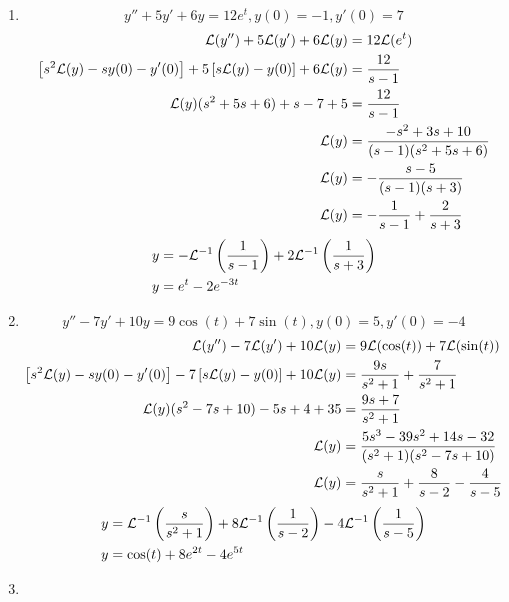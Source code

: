 \documentclass{article}
\begin{document}
\begin{enumerate}[label = \textbf{\arabic*)}]
	\item
		\begin{equation*}
			y'' + 5y' + 6y = 12e^t, y(0) = -1, y'(0) = 7
		\end{equation*}
		\begin{align*}
			\mathcal{L}(y'') + 5\mathcal{L}(y') + 6\mathcal{L}(y) & = 12\mathcal{L}(e^t) \\
			\left[ s^2\mathcal{L}(y) - sy(0) - y'(0) \right] + 5 \left[ s\mathcal{L}(y) - y(0) \right] + 6\mathcal{L}(y) & = \frac{12}{s - 1} \\
			\mathcal{L}(y)(s^2 + 5s + 6) + s - 7 + 5 & = \frac{12}{s - 1} \\
			\mathcal{L}(y) & = \frac{-s^2 + 3s + 10}{(s - 1)(s^2 + 5s + 6)} \\
			\mathcal{L}(y) & = -\frac{s - 5}{(s - 1)(s + 3)} \\
			\mathcal{L}(y) & = -\frac{1}{s - 1} + \frac{2}{s + 3}
		\end{align*}
		\begin{align*}
			y & = -\mathcal{L}^{-1} \left( \frac{1}{s - 1} \right) + 2\mathcal{L}^{-1} \left( \frac{1}{s + 3} \right) \\
			y & = e^t - 2e^{-3t}
		\end{align*}
	\item
		\begin{equation*}
			y'' - 7y' + 10y = 9\cos(t) + 7\sin(t), y(0) = 5, y'(0) = -4
		\end{equation*}
		\begin{align*}
			\mathcal{L}(y'') - 7\mathcal{L}(y') + 10\mathcal{L}(y) & = 9\mathcal{L}(\cos(t)) + 7\mathcal{L}(\sin(t)) \\
			\left[ s^2\mathcal{L}(y) - sy(0) - y'(0) \right] - 7 \left[ s\mathcal{L}(y) - y(0) \right] + 10\mathcal{L}(y) & = \frac{9s}{s^2 + 1} + \frac{7}{s^2 + 1} \\
			\mathcal{L}(y)(s^2 - 7s + 10) - 5s + 4 + 35 & = \frac{9s + 7}{s^2 + 1} \\
			\mathcal{L}(y) & = \frac{5s^3 - 39s^2 + 14s - 32}{(s^2 + 1)(s^2 - 7s + 10)} \\
			\mathcal{L}(y) & = \frac{s}{s^2 + 1} + \frac{8}{s - 2} - \frac{4}{s - 5}
		\end{align*}
		\begin{align*}
			y & = \mathcal{L}^{-1} \left( \frac{s}{s^2 + 1} \right) + 8\mathcal{L}^{-1} \left( \frac{1}{s - 2} \right) - 4\mathcal{L}^{-1} \left( \frac{1}{s - 5} \right) \\
			y & = \cos(t) + 8e^{2t} - 4e^{5t}
		\end{align*}
	\item

\end{enumerate}
\end{document}

